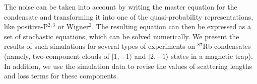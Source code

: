 \documentclass[10pt]{article}
\begin{document}
The noise can be taken into account by writing the master equation for the condensate and transforming it into one of the quasi-probability representations, like \mbox{positive-P}$^{2, 3}$ or Wigner$^2$. The resulting equation can then be expressed as a set of stochastic equations, which can be solved numerically. We present the results of such simulations for several types of experiments on $^{87}$Rb condensates (namely, two-component clouds of $\vert1,-1\rangle$ and $\vert2,-1\rangle$ states in a magnetic trap). In addition, we use the simulation data to revise the values of scattering lengths and loss terms for these components.



    
\end{document}
